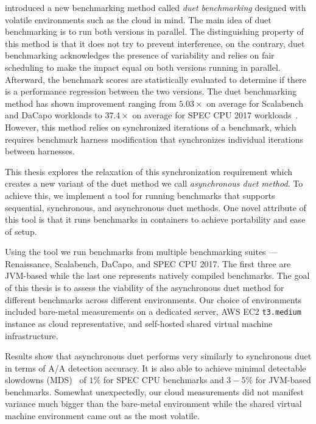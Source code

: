 \citet{bulej2020duet} introduced a new benchmarking method called \emph{duet benchmarking} designed with volatile environments such as the cloud in mind.
The main idea of duet benchmarking is to run both versions in parallel.
The distinguishing property of this method is that it does not try to prevent interference, on the contrary, duet benchmarking acknowledges the presence of variability and relies on fair scheduling to make the impact equal on both versions running in parallel.
Afterward, the benchmark scores are statistically evaluated to determine if there is a performance regression between the two versions.
The duet benchmarking method has shown improvement ranging from $5.03 \times$ on average for Scalabench and DaCapo workloads to $37.4 \times$ on average for SPEC CPU 2017 workloads~\cite{bulej2020duet}.
However, this method relies on synchronized iterations of a benchmark, which requires benchmark harness modification that synchronizes individual iterations between harnesses.

This thesis explores the relaxation of this synchronization requirement which creates a new variant of the duet method we call \emph{asynchronous duet method}.
To achieve this, we implement a tool for running benchmarks that supports sequential, synchronous, and asynchronous duet methods.
One novel attribute of this tool is that it runs benchmarks in containers to achieve portability and ease of setup.

Using the tool we run benchmarks from multiple benchmarking suites --- Renaissance, Scalabench, DaCapo, and SPEC CPU 2017.
The first three are \mbox{JVM-based} while the last one represents natively compiled benchmarks.
The goal of this thesis is to assess the viability of the asynchronous duet method for different benchmarks across different environments.
Our choice of environments included bare-metal measurements on a dedicated server, AWS EC2 \lstinline{t3.medium} instance as cloud representative, and self-hosted shared virtual machine infrastructure.

Results show that asynchronous duet performs very similarly to synchronous duet in terms of A/A detection accuracy.
It is also able to achieve minimal detectable slowdowns (MDS)~\cite{laaber2019software} of $1\%$ for SPEC CPU benchmarks and $3-5\%$ for \mbox{JVM-based} benchmarks.
Somewhat unexpectedly, our cloud measurements did not manifest variance much bigger than the \mbox{bare-metal} environment while the shared virtual machine environment came out as the most volatile.

